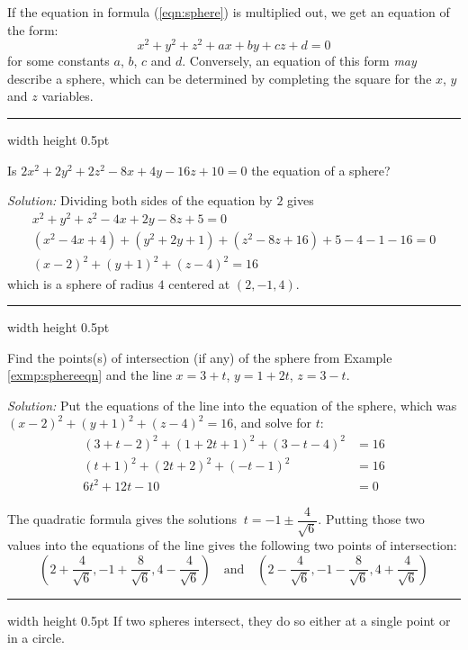 If the equation in formula (\ref{eqn:sphere}) is multiplied out, we get an equation of the form:
\begin{equation}\label{eqn:spheregeneral}
 x^2 + y^2 + z^2 + ax + by + cz + d = 0
\end{equation}
for some constants $a$, $b$, $c$ and $d$. Conversely, an equation of this form
\emph{may} describe a sphere, which can be determined by completing the
square for the $x$, $y$ and $z$ variables.

\vspace{2mm}
\hrule width \textwidth height 0.5pt
\begin{exmp}\label{exmp:sphereeqn}
 Is $2x^2 + 2y^2 + 2z^2 - 8x + 4y - 16z + 10 = 0$ the equation of a sphere?\vspace{1mm}
 \par\noindent\emph{Solution:} Dividing both sides of the equation by $2$ gives
 \begin{gather*}
  x^2 + y^2 + z^2 - 4x + 2y - 8z + 5 = 0\\
  (x^2 - 4x + 4) + (y^2 + 2y + 1) + (z^2 - 8z + 16) + 5 - 4 - 1 - 16 = 0\\
  (x - 2)^2 + (y + 1)^2 + (z - 4)^2 = 16
 \end{gather*}
 which is a sphere of radius $4$ centered at $(2,-1,4)$.
\end{exmp}
\hrule width \textwidth height 0.5pt
\begin{exmp}\label{exmp:sphereline}
 Find the points(s) of intersection (if any) of the sphere from Example \ref{exmp:sphereeqn} and the line
 $x = 3 + t$, $y = 1 + 2t$, $z = 3 - t$.\vspace{1mm}
 \par\noindent\emph{Solution:} Put the equations of the line into the equation of the sphere, which was
 $(x - 2)^2 + (y + 1)^2 + (z - 4)^2 = 16$, and solve for $t$:
 \begin{align*}
  (3 + t - 2)^2 + (1 + 2t + 1)^2 + (3 - t - 4)^2 &= 16\\
  (t + 1)^2 + (2t + 2)^2 + (-t - 1)^2 &= 16\\
  6t^2 + 12t -10 &= 0
 \end{align*}
 \par\noindent The quadratic formula gives the solutions $~t = -1 \pm \dfrac{4}{\sqrt{6}}$. Putting those
 two values into the equations of the line gives the following two points of intersection:
 \begin{displaymath}
  \left( 2 + \frac{4}{\sqrt{6}}, -1 + \frac{8}{\sqrt{6}}, 4 - \frac{4}{\sqrt{6}} \right) \quad \text{and} \quad
  \left( 2 - \frac{4}{\sqrt{6}}, -1 - \frac{8}{\sqrt{6}}, 4 + \frac{4}{\sqrt{6}} \right)
 \end{displaymath}
\end{exmp}
\hrule width \textwidth height 0.5pt
\newpage
If two spheres intersect, they do so either at a single point or in a circle.

